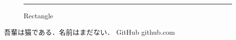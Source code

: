 \documentclass[uplatex,dvipdfmx]{jlreq}
\begin{document}
\lipsum[1-2]
  \begin{figure}[h]
    \centering
    \rule{8cm}{6cm}
    \caption{Rectangle}
  \end{figure}
吾輩は猫である．名前はまだない．
GitHub
github.com
\end{document}
